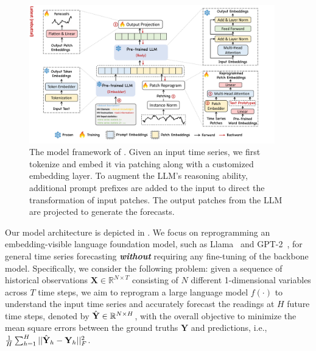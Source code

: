 \begin{figure}[t]
    \centering
    \includegraphics[width=0.95\textwidth]{figures/framework-v4-2.pdf}\vspace{-2mm}
    \caption{
    The model framework of \method. Given an input time series, we first tokenize and embed it via  patching along with a  customized embedding layer.   To augment the LLM's reasoning ability,  additional prompt prefixes are added to the input to direct the transformation of input patches.  The output patches from the LLM are projected to generate the forecasts.
    }
    \vspace{-4mm}
    \label{fig:framework}
\end{figure}

Our model architecture is depicted in . We focus on reprogramming an embedding-visible language foundation model, such as Llama~\citep{touvron2023llama} and GPT-2~\citep{radford2019language}, for general time series forecasting \textbf{\textit{without}} requiring any fine-tuning of the backbone model. Specifically, we consider the following problem: given a sequence of historical observations $\mathbf{X} \in \mathbb{R}^{N \times T}$ consisting of $N$ different 1-dimensional variables across $T$ time steps, we aim to reprogram a large language model $f(\cdot)$ to understand the input time series and accurately forecast the readings at $H$ future time steps, denoted by $\Hat{\mathbf{Y}} \in \mathbb{R}^{N \times H}$, with the overall objective to minimize the mean square errors between the ground truths $\mathbf{Y}$ and predictions, i.e., $\frac{1}{H} \sum_{h=1}^{H} || \Hat{\mathbf{Y}}_h - \mathbf{Y}_h ||^2_F$.

